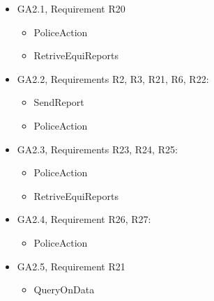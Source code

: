 \begin{itemize}
	\item GA2.1, Requirement R20
	\begin{itemize}
		\item PoliceAction
		\item RetriveEquiReports
	\end{itemize}
	\item GA2.2, Requirements R2, R3, R21, R6, R22:
	\begin{itemize}
		\item SendReport
		\item PoliceAction
	\end{itemize}
	\item GA2.3, Requirements R23, R24, R25:
	\begin{itemize}
		\item PoliceAction
		\item RetriveEquiReports
	\end{itemize}
	\item GA2.4, Requirement R26, R27:
	\begin{itemize}
		\item PoliceAction
	\end{itemize}
	\item GA2.5, Requirement R21
	\begin{itemize}
		\item QueryOnData
	\end{itemize}
\end{itemize}
